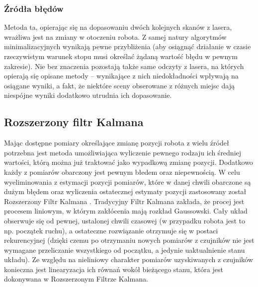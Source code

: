\subsubsection{Źródła błędów}

Metoda ta, opierając się na dopasowaniu dwóch kolejnych skanów z lasera,
wrażliwa jest na zmiany w otoczeniu robota. Z samej natury algorytmów
minimalizacyjnych wynikają pewne przybliżenia (aby osiągnąć działanie w czasie
rzeczywistym warunek stopu musi określać żądaną wartość błędu w pewnym
zakresie). Nie bez znaczenia pozostają także same odczyty z lasera, na których
opierają się opisane metody -- wynikające z nich niedokładności wpływają na
osiągane wyniki, a fakt, że niektóre sceny obserowane z różnych miejsc dają
niespójne wyniki dodatkowo utrudnia ich dopasowanie.

\subsection{Rozszerzony filtr Kalmana}

Mając dostępne pomiary określające zmianę pozycji robota z wielu źródeł potrzebna jest metoda
umożliwiająca wyliczenie pewnego rodzaju ich średniej wartości, którą można już traktować
jako wypadkową zmianę pozycji. Dodatkowo każdy z pomiarów obarczony jest pewnym błedem oraz
niepewnością. W celu wyeliminowania z estymacji pozycji pomiarów, które w danej chwili
obarczone są dużym błędem oraz wyliczenia ostatecznej estymaty pozycji zastosowany został
Rozszerzony Filtr Kalmana \cite{Thrun:2005:PR:1121596}. Tradycyjny Filtr Kalmana zakłada, że procej jest procesem
liniowym, w którym zakłócenia mają rozkład Gaussowski. Cały układ obserwuje się od pewnej,
ustalonej chwili czasowej (w przypadku robota jest to np. początek ruchu), a ostateczne
rozwiązanie otrzymuje się w postaci rekurencyjnej (dzięki czemu po otrzymaniu nowych pomiarów
z czujników nie jest wymagane przeliczanie wszystkiego od początku, a jedynie uaktualnienie
stanu układu). Ze względu na nieliniowy charakter pomiarów uzyskiwanych z czujników
konieczna jest linearyzacja ich równań wokół bieżącego stanu, która jest dokonywana w
Rozszerzonym Filtrze Kalmana.

